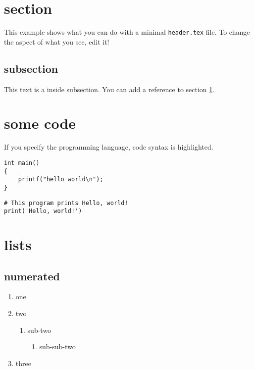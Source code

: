 


\maketitle
\section{section}
\label{sec:org88f058c}
This example shows what you can do with a minimal \texttt{header.tex} file.
To change the aspect of what you see, edit it!
\subsection{subsection}
\label{sec:org3551d0b}
This text is a inside subsection. You can add a reference to section \ref{sec:org88f058c}.

\section{some code}
\label{sec:org638502b}
If you specify the programming language, code syntax is highlighted.
\begin{verbatim}
int main()
{
    printf("hello world\n");
}
\end{verbatim}

\begin{verbatim}
# This program prints Hello, world!
print('Hello, world!')
\end{verbatim}

\section{lists}
\label{sec:org61e129b}
\subsection{numerated}
\label{sec:org1f91ed4}
\begin{enumerate}
\item one
\item two
\begin{enumerate}
\item sub-two
\begin{enumerate}
\item sub-sub-two
\end{enumerate}
\end{enumerate}
\item three
\end{enumerate}

